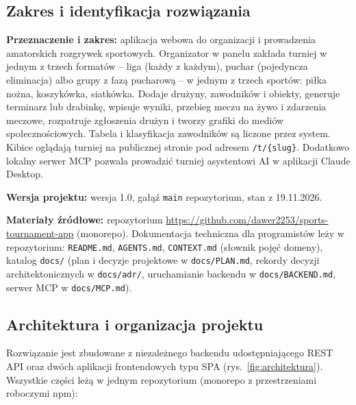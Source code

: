 \documentclass[11pt,a4paper,oneside]{article}
\newif\ifpodpowiedzi
\newcommand{\podpowiedz}[1]{\ifpodpowiedzi\par\begingroup\small\color{hintcolor}\textit{Wskazówka: #1}\par\endgroup\fi}
\begin{document}
\subsection{Zakres i identyfikacja rozwiązania}
\podpowiedz{Opisz przeznaczenie projektu, najważniejsze wymagania oraz wersję, której dotyczy dokumentacja. Wskaż, gdzie znajdują się pliki źródłowe i zasoby: repozytorium dla projektu programistycznego lub inne miejsce uzgodnione z prowadzącymi. Podaj commit, tag albo oznaczenie wersji plików.}
\textbf{Przeznaczenie i zakres:} aplikacja webowa do organizacji i prowadzenia amatorskich rozgrywek sportowych. Organizator w panelu zakłada turniej w jednym z trzech formatów -- liga (każdy z każdym), puchar (pojedyncza eliminacja) albo grupy z fazą pucharową -- w jednym z trzech sportów: piłka nożna, koszykówka, siatkówka. Dodaje drużyny, zawodników i obiekty, generuje terminarz lub drabinkę, wpisuje wyniki, przebieg meczu na żywo i zdarzenia meczowe, rozpatruje zgłoszenia drużyn i tworzy grafiki do mediów społecznościowych. Tabela i klasyfikacja zawodników są liczone przez system. Kibice oglądają turniej na publicznej stronie pod adresem \texttt{/t/\{slug\}}. Dodatkowo lokalny serwer MCP pozwala prowadzić turniej asystentowi AI w aplikacji Claude Desktop.\par
\textbf{Wersja projektu:} wersja 1.0, gałąź \texttt{main} repozytorium, stan z 19.11.2026.\par
\textbf{Materiały źródłowe:} repozytorium \url{https://github.com/dawer2253/sports-tournament-app} (monorepo). Dokumentacja techniczna dla programistów leży w repozytorium: \texttt{README.md}, \texttt{AGENTS.md}, \texttt{CONTEXT.md} (słownik pojęć domeny), katalog \texttt{docs/} (plan i decyzje projektowe w \texttt{docs/PLAN.md}, rekordy decyzji architektonicznych w \texttt{docs/adr/}, uruchamianie backendu w \texttt{docs/BACKEND.md}, serwer MCP w \texttt{docs/MCP.md}).

\newpage
\subsection{Architektura i organizacja projektu}
\podpowiedz{Przedstaw główne elementy rozwiązania, ich odpowiedzialności i powiązania. Dla aplikacji opisz komponenty i przepływ danych; dla animacji 3D -- organizację scen, obiektów, zasobów i etapów przetwarzania. Wyjaśnij najważniejsze decyzje i zależności. Dodaj schemat, jeśli pomaga zrozumieć rozwiązanie.}
Rozwiązanie jest zbudowane z niezależnego backendu udostępniającego REST API oraz dwóch aplikacji frontendowych typu SPA (rys.~\ref{fig:architektura}). Wszystkie części leżą w jednym repozytorium (monorepo z przestrzeniami roboczymi npm):
\end{document}
